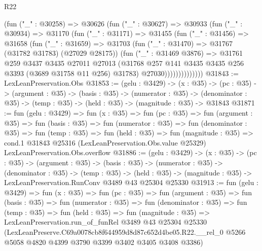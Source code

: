 \begin{lexlean}{R22}
\begin{coremodule}
                  (fun ("_" : @30258) =>
                  @30626
                    (fun ("_" : @30627) =>
                    @30933
                      (fun ("_" : @30934) =>
                      @31170
                        (fun ("_" : @31171) =>
                        @31455
                          (fun ("_" : @31456) =>
                          @31658
                            (fun ("_" : @31659) =>
                            @31703
                              (fun ("_" : @31470) => @31767 (@31782 @31783) (@27029 @28175))
                              (fun ("_" : @31469 @3876) =>
                              @31761
                                @259
                                @3437
                                @3435
                                @27011
                                @27013
                                (@31768
                                  @257
                                  @141
                                  @3435
                                  @3435
                                  @256
                                  @3393
                                  (@3689 @31758 @11 @256)
                                  @31783)
                                @27030))))))))))))))
@31843 := LexLeanPreservation.Obs
@31853 := (gelu : @3429) ->
  (x : @35) ->
  (pc : @35) ->
  (argument : @35) ->
  (basis : @35) ->
  (numerator : @35) ->
  (denominator : @35) -> (temp : @35) -> (held : @35) -> (magnitude : @35) -> @31843
@31871 := fun (gelu : @3429) =>
  fun (x : @35) =>
  fun (pc : @35) =>
  fun (argument : @35) =>
  fun (basis : @35) =>
  fun (numerator : @35) =>
  fun (denominator : @35) =>
  fun (temp : @35) =>
  fun (held : @35) =>
  fun (magnitude : @35) =>
  cond.{1} @31843 @25316 (LexLeanPreservation.Obs.value @25329) LexLeanPreservation.Obs.overflow
@31886 := (gelu : @3429) ->
  (x : @35) ->
  (pc : @35) ->
  (argument : @35) ->
  (basis : @35) ->
  (numerator : @35) ->
  (denominator : @35) ->
  (temp : @35) ->
  (held : @35) -> (magnitude : @35) -> LexLeanPreservation.RunConv @3489 @43 @25304 @25330
@31913 := fun (gelu : @3429) =>
  fun (x : @35) =>
  fun (pc : @35) =>
  fun (argument : @35) =>
  fun (basis : @35) =>
  fun (numerator : @35) =>
  fun (denominator : @35) =>
  fun (temp : @35) =>
  fun (held : @35) =>
  fun (magnitude : @35) =>
  LexLeanPreservation.run_of_funRel
    @3489
    @43
    @25304
    @25330
    (LexLeanPreserve.C69a0078cb8f644959d8d87c652d4be05.R22.__rel_0
      @5266
      @5058
      @4820
      @4399
      @3790
      @3399
      @3402
      @3405
      @3408
      @3386)
\end{coremodule}
\end{lexlean}
